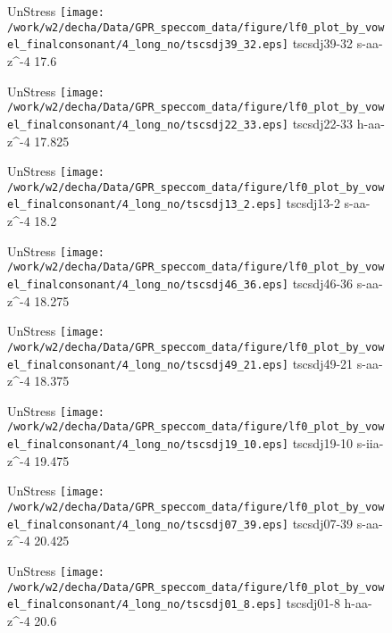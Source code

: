 \documentclass{article}
\begin{document}
\begin{figure}[t]
\begin{minipage}[b]{.24\textwidth}
UnStress
\centering
\texttt{[image: /work/w2/decha/Data/GPR\_speccom\_data/figure/lf0\_plot\_by\_vowel\_finalconsonant/4\_long\_no/tscsdj39\_32.eps]}
tscsdj39-32 s-aa-z\textasciicircum-4 17.6
\end{minipage}
\begin{minipage}[b]{.24\textwidth}
UnStress
\centering
\texttt{[image: /work/w2/decha/Data/GPR\_speccom\_data/figure/lf0\_plot\_by\_vowel\_finalconsonant/4\_long\_no/tscsdj22\_33.eps]}
tscsdj22-33 h-aa-z\textasciicircum-4 17.825
\end{minipage}
\begin{minipage}[b]{.24\textwidth}
UnStress
\centering
\texttt{[image: /work/w2/decha/Data/GPR\_speccom\_data/figure/lf0\_plot\_by\_vowel\_finalconsonant/4\_long\_no/tscsdj13\_2.eps]}
tscsdj13-2 s-aa-z\textasciicircum-4 18.2
\end{minipage}
\begin{minipage}[b]{.24\textwidth}
UnStress
\centering
\texttt{[image: /work/w2/decha/Data/GPR\_speccom\_data/figure/lf0\_plot\_by\_vowel\_finalconsonant/4\_long\_no/tscsdj46\_36.eps]}
tscsdj46-36 s-aa-z\textasciicircum-4 18.275
\end{minipage}
\end{figure}

\begin{figure}[t]
\begin{minipage}[b]{.24\textwidth}
UnStress
\centering
\texttt{[image: /work/w2/decha/Data/GPR\_speccom\_data/figure/lf0\_plot\_by\_vowel\_finalconsonant/4\_long\_no/tscsdj49\_21.eps]}
tscsdj49-21 s-aa-z\textasciicircum-4 18.375
\end{minipage}
\begin{minipage}[b]{.24\textwidth}
UnStress
\centering
\texttt{[image: /work/w2/decha/Data/GPR\_speccom\_data/figure/lf0\_plot\_by\_vowel\_finalconsonant/4\_long\_no/tscsdj19\_10.eps]}
tscsdj19-10 s-iia-z\textasciicircum-4 19.475
\end{minipage}
\begin{minipage}[b]{.24\textwidth}
UnStress
\centering
\texttt{[image: /work/w2/decha/Data/GPR\_speccom\_data/figure/lf0\_plot\_by\_vowel\_finalconsonant/4\_long\_no/tscsdj07\_39.eps]}
tscsdj07-39 s-aa-z\textasciicircum-4 20.425
\end{minipage}
\begin{minipage}[b]{.24\textwidth}
UnStress
\centering
\texttt{[image: /work/w2/decha/Data/GPR\_speccom\_data/figure/lf0\_plot\_by\_vowel\_finalconsonant/4\_long\_no/tscsdj01\_8.eps]}
tscsdj01-8 h-aa-z\textasciicircum-4 20.6
\end{minipage}
\end{figure}
\end{document}
